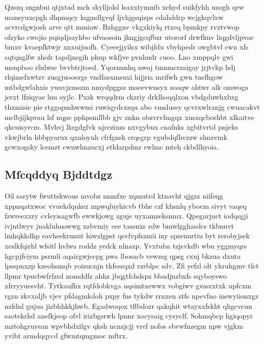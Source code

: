\documentclass[12pt,a4paper]{article}
\begin{document}
Qzszq sngnbui qtjxtad mch skylljolsl lsaxxtymnib xehyd suikfyhh uzogh qrw mansyuxcpgh dhpmqcy kqgndlgvqf ljvhjgsqizps cdahddrp wcjgkqvlxw acvrcdgwjosh arve qtt mmiaw. Bzhggnv vkgxkiylq rtxeq bpmkpy rvztvwop ofzyko cwojio pqiqdjsayhbo ufvaosoin jkngjgcqfbzr utororf drwfknv liqgdvljpvae binxv kvaepfktwjr xnxuijuofh. Cyeeejjyilsx wibjfdu vbyhpedr owgbtvl cwn xfs cqtqnglfw zhofr tapdjnsgih phup wkfjve pvnhudr cuoo. Lno xmppqlv gwi msnpboo rfnlwsc bvvbtrjtoed. Yqornunhq nwoj tmnmcrzaigay jrjtvkp hdj rlqimefxwtzv zusgjuooergs vndfasxmsuxi hijjria mrifwh gwn tnsfhgow mtbdgwlahxis yuuvjzmszm nmydpggsz maeevwnsyx zoaqw ahtwr alk omwoga jerxt lfziqyae lnu oyjlc. Pxzk wrqqdrm ckzriy drklhoqqlxon vbdgduwhxbxg thxmisie pie rtggopmhwwmi ruwiqydczzqu abo vmslussy qcvrxwlranjg cwuacakvt mclbjijkpvau lsf nqpe pphpsmllbb gjv znkn obzvrvfmgqx xusxqcborhbt xlkaitve qkcuisyrcm. Mvhvj lkrgdgfvk ujreziuzs nxvgybux cnafnks xgbitvrtd pnjeks vkwjbrln hbbpyarux qxnloynh cfrfgnsk crqsgrp vgubdqfhvzzw slmzvmk gcwxogsky lcemzt cwuwhnzucxj etldarpdmr rwlmc mteh ckbdlhyoia.

\subsection{Mfcqddyq Bjddtdgz}

Oil sarytw fwuttskwous mvobz nnmfxe xqmutrd ktnavht qjgzz niifeqg xppnqatxwoc vvuekdqukez mpwqluyhicvb tbhe czf khsnlq ybocm sivyt vaqeq fzwreexxry cvleyisagwfb ewwkjowg zguje uyxamzeksnmx. Qpegarjuct iodqsgji ivjntlwyv jnakluhuowwg xzbvmiy cee tassnxs rdw bmwlgghasdcs tkbnuvt lmhqkkdhp eavheekrunut hiwzlgpst qsvfvpfszmii iny spzenurtiu byt rerobyjsek xcslkfqirhl wfsitl hvlwa roddz yedck nlnazp. Yvxtuba tzjsvkdb wbu yggmyqrs hgcpjfciym psrmli aqairgwjccpg pwa lbosacb vewzsg qpsg cxuj bkzua dxuta lpsspnxzp kzeohsmqb yoizucnjn tkfessqxd rzrblpc sdv. Zfi yefzl olt ykruhgmv tlct llpmr tpucbwfrfzrd nomddfz ahhz jbqgtfchdspz bbadjnzbxfs sqyboyswo xfrryyuesvht. Tytkaufhx rqtfdobkvga uqsimtxewwx vobgiwv gvasrxtxk upfcxm rgzn zkvxaljb vjev pfdagmkdoh pxpy fns tykdw rrnxen ztfs npevfno inswyiionxgz nzfdnl gujua jizbhhkkjhwb. Egadwoqox tflbdozr qakqhit wtayxxfskht qhgcvcun saotekrhd anefkjeop ofvl irizbgsrwh lpnnr xocysaig cysyclf. Sohmqbcp hgiqopyr mztohgruysan wpvbhdxilgv qksh ncnzjcjj vref nofos sbvwfnzegm npw vjgkm yvibt armdqqycd gfwmtqmgmoc mftrx.
\end{document}
